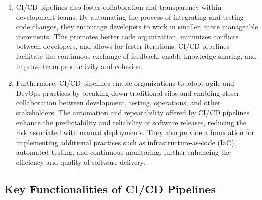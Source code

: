 \begin{enumerate}
    \item CI/CD pipelines also foster collaboration and transparency within development teams. By automating the process of integrating and testing code changes, they encourage developers to work in smaller, more manageable increments. This promotes better code organization, minimizes conflicts between developers, and allows for faster iterations. CI/CD pipelines facilitate the continuous exchange of feedback, enable knowledge sharing, and improve team productivity and cohesion.

    \item Furthermore, CI/CD pipelines enable organizations to adopt agile and DevOps practices by breaking down traditional silos and enabling closer collaboration between development, testing, operations, and other stakeholders. The automation and repeatability offered by CI/CD pipelines enhance the predictability and reliability of software releases, reducing the risk associated with manual deployments. They also provide a foundation for implementing additional practices such as infrastructure-as-code (IaC), automated testing, and continuous monitoring, further enhancing the efficiency and quality of software delivery.

\end{enumerate}

\subsection*{Key Functionalities of CI/CD Pipelines}

